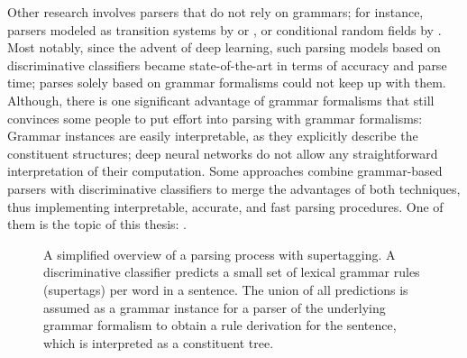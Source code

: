 \documentclass[../document.tex]{subfiles}
\begin{document}
    Other research involves parsers that do not rely on grammars; for instance, parsers modeled as transition systems by \citet{Verseley14} or \citet{CoaCoh19}, or conditional random fields by \citet{Petrov08}.
    Most notably, since the advent of deep learning, such parsing models based on discriminative classifiers became state-of-the-art in terms of accuracy and parse time; parses solely based on grammar formalisms could not keep up with them.
    Although, there is one significant advantage of grammar formalisms that still convinces some people to put effort into parsing with grammar formalisms:
        Grammar instances are easily interpretable, as they explicitly describe the constituent structures; deep neural networks do not allow any straightforward interpretation of their computation.
    Some approaches combine grammar-based parsers with discriminative classifiers to merge the advantages of both techniques, thus implementing interpretable, accurate, and fast parsing procedures.
    One of them is the topic of this thesis: .

    \begin{figure}
        \resizebox{\linewidth}{!}{}
        \caption{\label{fig:supertagging}
            A simplified overview of a parsing process with supertagging.
            A discriminative classifier predicts a small set of lexical grammar rules (supertags) per word in a sentence.
            The union of all predictions is assumed as a grammar instance for a parser of the underlying grammar formalism to obtain a rule derivation for the sentence, which is interpreted as a constituent tree.
        }
    \end{figure}
\end{document}
